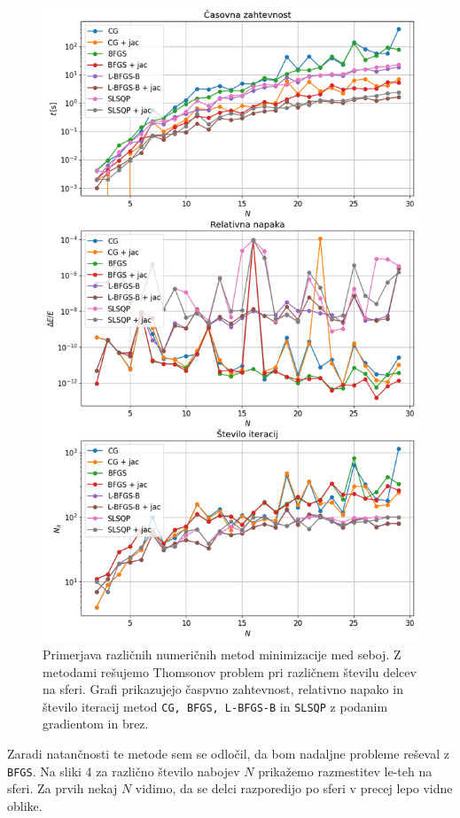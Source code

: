 \documentclass[slovene,11pt,a4paper]{article}
\begin{document}
\newpage
\begin{figure}[h!]
\centering
\includegraphics[width=12.5cm]{metode2.png}
\caption{Primerjava različnih numeričnih metod minimizacije med seboj. Z metodami rešujemo Thomsonov problem pri različnem številu delcev na sferi. Grafi prikazujejo časpvno zahtevnost, relativno napako in število iteracij metod \texttt{CG, BFGS, L-BFGS-B} in \texttt{SLSQP} z podanim gradientom in brez.}
\end{figure}

\newpage

Zaradi natančnosti te metode sem se odločil, da bom nadaljne probleme reševal z \texttt{BFGS}. Na sliki 4 za različno število nabojev $N$ prikažemo razmestitev le-teh na sferi. Za prvih nekaj $N$ vidimo, da se delci razporedijo po sferi v precej lepo vidne oblike.
\end{document}
